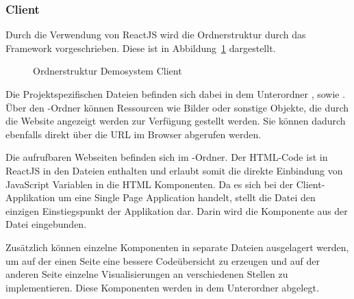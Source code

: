 \subsubsection{Client}
Durch die Verwendung von ReactJS wird die Ordnerstruktur durch das Framework vorgeschrieben.
Diese ist in Abbildung~\ref{fig:OrdnerstrukturClient} dargestellt.
\begin{figure}[H]
    \caption{Ordnerstruktur Demosystem Client}
    \label{fig:OrdnerstrukturClient}
\end{figure}
Die Projektspezifischen Dateien befinden sich dabei in dem Unterordner , sowie .
Über den -Ordner können Ressourcen wie Bilder oder sonstige Objekte, die durch die Website angezeigt werden zur Verfügung gestellt werden.
Sie können dadurch ebenfalls direkt über die URL im Browser abgerufen werden.

Die aufrufbaren Webseiten befinden sich im -Ordner.
Der \ac{HTML}-Code ist in ReactJS in den  Dateien enthalten und erlaubt somit die direkte Einbindung von JavaScript Variablen in die \ac{HTML} Komponenten.
Da es sich bei der Client-Applikation um eine Single Page Application handelt, stellt die  Datei den einzigen Einstiegspunkt der Applikation dar.
Darin wird die Komponente  aus der Datei  eingebunden.

Zusätzlich können einzelne Komponenten in separate Dateien ausgelagert werden, um auf der einen Seite eine bessere Codeübersicht zu erzeugen und auf der anderen Seite einzelne Visualisierungen an verschiedenen Stellen zu implementieren.
Diese Komponenten werden in dem Unterordner  abgelegt.

